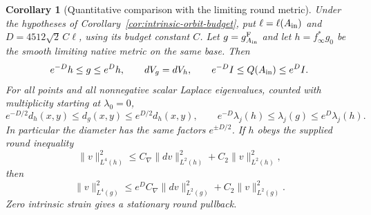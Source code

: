 \documentclass[11pt]{article}
\numberwithin{equation}{section}
\newtheorem{corollary}[theorem]{Corollary}
\theoremstyle{definition}
\theoremstyle{remark}
\begin{document}
\begin{corollary}[Quantitative comparison with the limiting round metric]
\label{cor:intrinsic-round-geometry}
Under the hypotheses of
Corollary~\ref{cor:intrinsic-orbit-budget}, put
$\ell=\ell(A_{\rm in})$ and
$D=4512\sqrt2\,C\ell$, using its budget constant $C$.
Let $g=g^{\rm F}_{A_{\rm in}}$ and let $h=f_\infty^*g_0$
be the smooth limiting native metric on the same base.
Then
\[
 e^{-D}h\le g\le e^Dh,\qquad dV_g=dV_h,\qquad
 e^{-D}I\le Q(A_{\rm in})\le e^DI.
\]
For all points and all nonnegative scalar Laplace eigenvalues, counted
with multiplicity starting at $\lambda_0=0$,
\[
 e^{-D/2}d_h(x,y)\le d_g(x,y)\le e^{D/2}d_h(x,y),
 \qquad
 e^{-D}\lambda_j(h)\le\lambda_j(g)\le e^D\lambda_j(h).
\]
In particular the diameter has the same factors $e^{\pm D/2}$.
If $h$ obeys the supplied round inequality
\[
 \|v\|_{L^4(h)}^2\le
 C_\nabla\|dv\|_{L^2(h)}^2+C_2\|v\|_{L^2(h)}^2,
\]
then
\[
 \|v\|_{L^4(g)}^2\le
 e^DC_\nabla\|dv\|_{L^2(g)}^2+C_2\|v\|_{L^2(g)}^2 .
\]
Zero intrinsic strain gives a stationary round pullback.
\end{corollary}
\end{document}
